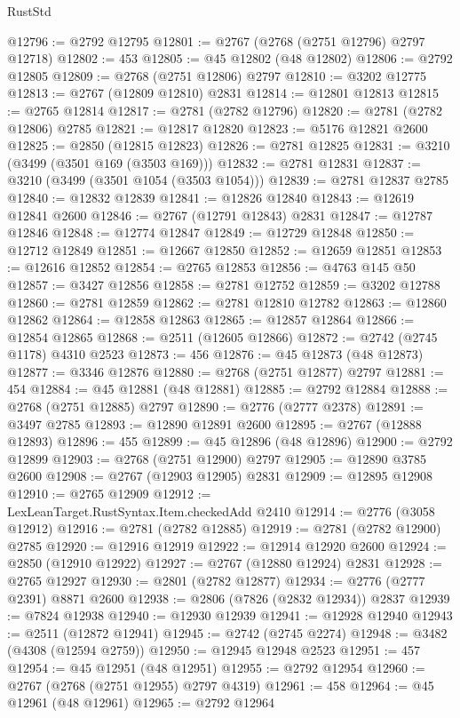\begin{lexlean}{RustStd}
\begin{coremodule}
@12796 := @2792 @12795
@12801 := @2767 (@2768 (@2751 @12796) @2797 @12718)
@12802 := 453
@12805 := @45 @12802 (@48 @12802)
@12806 := @2792 @12805
@12809 := @2768 (@2751 @12806) @2797
@12810 := @3202 @12775
@12813 := @2767 (@12809 @12810) @2831
@12814 := @12801 @12813
@12815 := @2765 @12814
@12817 := @2781 (@2782 @12796)
@12820 := @2781 (@2782 @12806) @2785
@12821 := @12817 @12820
@12823 := @5176 @12821 @2600
@12825 := @2850 (@12815 @12823)
@12826 := @2781 @12825
@12831 := @3210 (@3499 (@3501 @169 (@3503 @169)))
@12832 := @2781 @12831
@12837 := @3210 (@3499 (@3501 @1054 (@3503 @1054)))
@12839 := @2781 @12837 @2785
@12840 := @12832 @12839
@12841 := @12826 @12840
@12843 := @12619 @12841 @2600
@12846 := @2767 (@12791 @12843) @2831
@12847 := @12787 @12846
@12848 := @12774 @12847
@12849 := @12729 @12848
@12850 := @12712 @12849
@12851 := @12667 @12850
@12852 := @12659 @12851
@12853 := @12616 @12852
@12854 := @2765 @12853
@12856 := @4763 @145 @50
@12857 := @3427 @12856
@12858 := @2781 @12752
@12859 := @3202 @12788
@12860 := @2781 @12859
@12862 := @2781 @12810 @12782
@12863 := @12860 @12862
@12864 := @12858 @12863
@12865 := @12857 @12864
@12866 := @12854 @12865
@12868 := @2511 (@12605 @12866)
@12872 := @2742 (@2745 @1178) @4310 @2523
@12873 := 456
@12876 := @45 @12873 (@48 @12873)
@12877 := @3346 @12876
@12880 := @2768 (@2751 @12877) @2797
@12881 := 454
@12884 := @45 @12881 (@48 @12881)
@12885 := @2792 @12884
@12888 := @2768 (@2751 @12885) @2797
@12890 := @2776 (@2777 @2378)
@12891 := @3497 @2785
@12893 := @12890 @12891 @2600
@12895 := @2767 (@12888 @12893)
@12896 := 455
@12899 := @45 @12896 (@48 @12896)
@12900 := @2792 @12899
@12903 := @2768 (@2751 @12900) @2797
@12905 := @12890 @3785 @2600
@12908 := @2767 (@12903 @12905) @2831
@12909 := @12895 @12908
@12910 := @2765 @12909
@12912 := LexLeanTarget.RustSyntax.Item.checkedAdd @2410
@12914 := @2776 (@3058 @12912)
@12916 := @2781 (@2782 @12885)
@12919 := @2781 (@2782 @12900) @2785
@12920 := @12916 @12919
@12922 := @12914 @12920 @2600
@12924 := @2850 (@12910 @12922)
@12927 := @2767 (@12880 @12924) @2831
@12928 := @2765 @12927
@12930 := @2801 (@2782 @12877)
@12934 := @2776 (@2777 @2391) @8871 @2600
@12938 := @2806 (@7826 (@2832 @12934)) @2837
@12939 := @7824 @12938
@12940 := @12930 @12939
@12941 := @12928 @12940
@12943 := @2511 (@12872 @12941)
@12945 := @2742 (@2745 @2274)
@12948 := @3482 (@4308 (@12594 @2759))
@12950 := @12945 @12948 @2523
@12951 := 457
@12954 := @45 @12951 (@48 @12951)
@12955 := @2792 @12954
@12960 := @2767 (@2768 (@2751 @12955) @2797 @4319)
@12961 := 458
@12964 := @45 @12961 (@48 @12961)
@12965 := @2792 @12964

\end{coremodule}
\end{lexlean}
